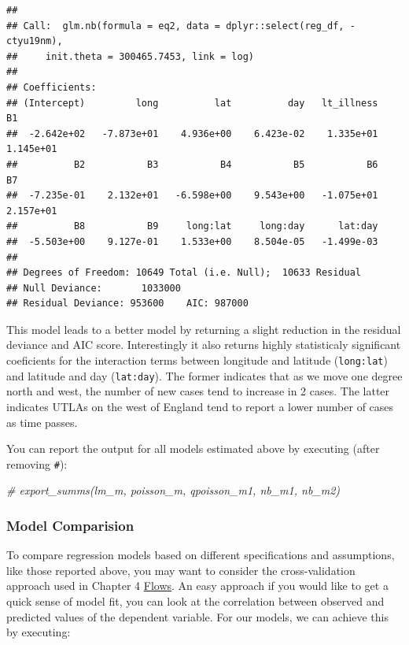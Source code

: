 \documentclass[
]{book}
\newenvironment{Shaded}{\begin{snugshade}}{\end{snugshade}}
\newcommand{\CommentTok}[1]{\textcolor[rgb]{0.56,0.35,0.01}{\textit{#1}}}
\begin{document}
\begin{verbatim}
## 
## Call:  glm.nb(formula = eq2, data = dplyr::select(reg_df, -ctyu19nm), 
##     init.theta = 300465.7453, link = log)
## 
## Coefficients:
## (Intercept)         long          lat          day   lt_illness           B1  
##  -2.642e+02   -7.873e+01    4.936e+00    6.423e-02    1.335e+01    1.145e+01  
##          B2           B3           B4           B5           B6           B7  
##  -7.235e-01    2.132e+01   -6.598e+00    9.543e+00   -1.075e+01    2.157e+01  
##          B8           B9     long:lat     long:day      lat:day  
##  -5.503e+00    9.127e-01    1.533e+00    8.504e-05   -1.499e-03  
## 
## Degrees of Freedom: 10649 Total (i.e. Null);  10633 Residual
## Null Deviance:       1033000 
## Residual Deviance: 953600    AIC: 987000
\end{verbatim}

This model leads to a better model by returning a slight reduction in the residual deviance and AIC score. Interestingly it also returns highly statisticaly significant coeficients for the interaction terms between longitude and latitude (\texttt{long:lat}) and latitude and day (\texttt{lat:day}). The former indicates that as we move one degree north and west, the number of new cases tend to increase in 2 cases. The latter indicates UTLAs on the west of England tend to report a lower number of cases as time passes.

You can report the output for all models estimated above by executing (after removing \texttt{\#}):

\begin{Shaded}
\begin{Highlighting}[]
\CommentTok{\# export\_summs(lm\_m, poisson\_m, qpoisson\_m1, nb\_m1, nb\_m2)}
\end{Highlighting}
\end{Shaded}

\hypertarget{model-comparision}{%
\subsubsection{Model Comparision}\label{model-comparision}}

To compare regression models based on different specifications and assumptions, like those reported above, you may want to consider the cross-validation approach used in Chapter 4 \protect\hyperlink{flows}{Flows}. An easy approach if you would like to get a quick sense of model fit, you can look at the correlation between observed and predicted values of the dependent variable. For our models, we can achieve this by executing:
\end{document}
